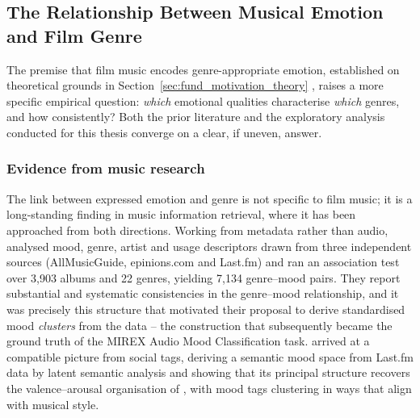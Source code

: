 \subsection{The Relationship Between Musical Emotion and Film Genre}
\label{subsec:emotion_genre}

The premise that film music encodes genre-appropriate emotion, established on
theoretical grounds in Section~\ref{sec:fund_motivation_theory}
\citep{gorbman1987unheard,juslin2013everyday}, raises a more specific empirical
question: \emph{which} emotional qualities characterise \emph{which} genres, and how
consistently? Both the prior literature and the exploratory analysis conducted for this
thesis converge on a clear, if uneven, answer.

\subsubsection*{Evidence from music research}

The link between expressed emotion and genre is not specific to film music; it is a
long-standing finding in music information retrieval, where it has been approached from
both directions. Working from metadata rather than audio,
\citet{hu2007exploring} analysed mood, genre, artist and usage descriptors drawn from
three independent sources (AllMusicGuide, epinions.com and Last.fm) and ran an
association test over 3{,}903 albums and 22 genres, yielding 7{,}134 genre--mood pairs.
They report substantial and systematic consistencies in the genre--mood relationship, and
it was precisely this structure that motivated their proposal to derive standardised
mood \emph{clusters} from the data -- the construction that subsequently became the
ground truth of the MIREX Audio Mood Classification task. \citet{laurier2009mood}
arrived at a compatible picture from social tags, deriving a semantic mood space from
Last.fm data by latent semantic analysis and showing that its principal structure
recovers the valence--arousal organisation of \citet{russell1980circumplex}, with mood
tags clustering in ways that align with musical style.

